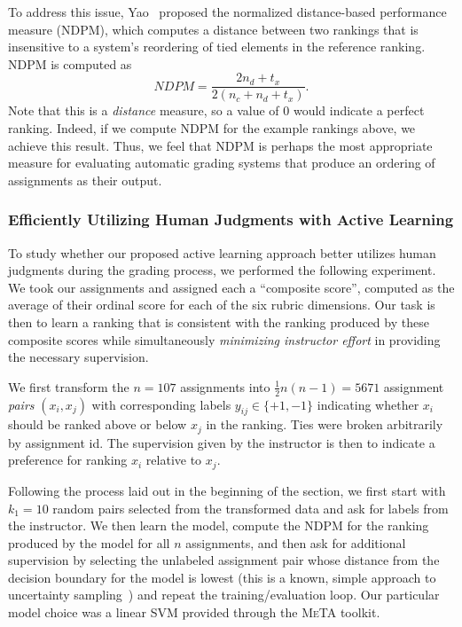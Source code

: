 To address this issue, Yao~\cite{Yao:1995:JASIS} proposed the normalized
distance-based performance measure (NDPM), which computes a distance
between two rankings that is insensitive to a system's reordering of tied
elements in the reference ranking. NDPM is computed as
\[
    NDPM = \frac{2n_d + t_x}{2(n_c + n_d + t_x)}.
\]
Note that this is a \emph{distance} measure, so a value of $0$ would
indicate a perfect ranking. Indeed, if we compute NDPM for the example
rankings above, we achieve this result. Thus, we feel that NDPM is perhaps
the most appropriate measure for evaluating automatic grading systems that
produce an ordering of assignments as their output.

\subsubsection{Efficiently Utilizing Human Judgments with Active Learning}
To study whether our proposed active learning approach better utilizes
human judgments during the grading process, we performed the following
experiment. We took our assignments and assigned each a ``composite
score'', computed as the average of their ordinal score for each of the six
rubric dimensions. Our task is then to learn a ranking that is consistent
with the ranking produced by these composite scores while simultaneously
\emph{minimizing instructor effort} in providing the necessary supervision.

We first transform the $n = 107$ assignments into $\frac{1}{2}n(n-1) =
5671$ assignment \emph{pairs} $(x_i, x_j)$ with corresponding labels
$y_{ij} \in \{+1, -1\}$ indicating whether $x_i$ should be ranked above or
below $x_j$ in the ranking. Ties were broken arbitrarily by assignment id.
The supervision given by the instructor is then to indicate a preference
for ranking $x_i$ relative to $x_j$.

Following the process laid out in the beginning of the section, we first
start with $k_1 = 10$ random pairs selected from the transformed data and
ask for labels from the instructor. We then learn the model, compute the
NDPM for the ranking produced by the model for all $n$ assignments, and
then ask for additional supervision by selecting the unlabeled assignment
pair whose distance from the decision boundary for the model is lowest
(this is a known, simple approach to uncertainty
sampling~\cite{Settles:2012}) and repeat the training/evaluation loop. Our
particular model choice was a linear SVM provided through the \textsc{MeTA}
toolkit.

